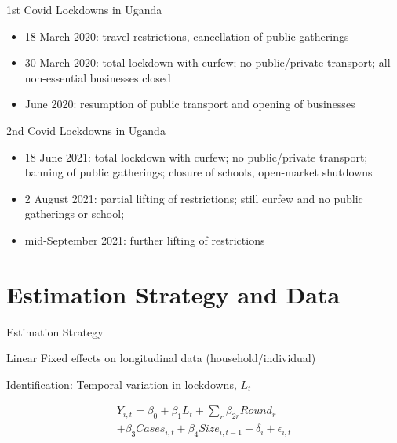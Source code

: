 \documentclass{beamer} %
\begin{document}
\begin{frame}{1st Covid Lockdowns in Uganda}


\begin{itemize}
\item 18 March 2020: travel restrictions, cancellation 
of public gatherings 
\item 30 March 2020: total lockdown with curfew; no public/private transport; 
all non-essential businesses closed
\item June 2020: resumption of public transport and opening of businesses
\end{itemize}

\end{frame}

\begin{frame}{2nd Covid Lockdowns in Uganda}

\begin{itemize}
\item 18 June 2021: total lockdown with curfew; no public/private transport;
banning of public gatherings; closure of schools, open-market shutdowns
\item 2 August 2021: partial lifting of restrictions; still curfew and 
no public gatherings or school; 
\item mid-September 2021: further lifting of restrictions
\end{itemize}

\end{frame}



\section{Estimation Strategy and Data}

\begin{frame}{Estimation Strategy}

Linear Fixed effects on longitudinal data (household/individual)

\bigskip

Identification: Temporal variation in lockdowns, $L_t$

\begin{multline}
Y_{i,t} = \beta_0 + \beta_1 L_t + \sum_{r} \beta_{2r}  Round_r  \\
+ \beta_3 Cases_{i,t} + \beta_4 Size_{i,t-1}  + \delta_i + \epsilon_{i,t}
\end{multline}

\end{frame}
\end{document}
